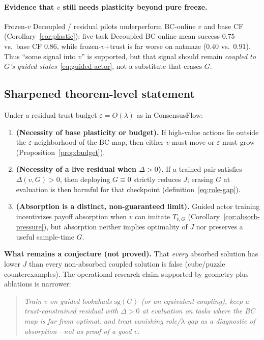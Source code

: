 \paragraph{Evidence that $v$ still needs plasticity beyond pure freeze.}
Frozen-$v$ Decoupled / residual pilots underperform BC-online $v$ and base CF
(Corollary~\ref{cor:plastic}): five-task Decoupled BC-online mean success
$0.75$ vs.\ base CF $0.86$, while frozen-$v$+trust is far worse on antmaze
($0.40$ vs.\ $0.91$).
Thus ``some signal into $v$'' is supported, but that signal should remain
\emph{coupled to $G$'s guided states}~\eqref{eq:guided-actor}, not a substitute
that erases $G$.

\subsection{Sharpened theorem-level statement}
\label{subsec:vg-sharpened}

\begin{theorem}
\label{thm:goldilocks}
Under a residual trust budget $\varepsilon=O(\lambda)$ as in ConsensusFlow:
\begin{enumerate}
  \item \textbf{(Necessity of base plasticity or budget).}
  If high-value actions lie outside the $\varepsilon$-neighborhood of the BC
  map, then either $v$ must move or $\varepsilon$ must grow
  (Proposition~\ref{prop:budget}).
  \item \textbf{(Necessity of a live residual when $\Delta>0$).}
  If a trained pair satisfies $\Delta(v,G)>0$, then deploying $G\equiv 0$
  strictly reduces $J$; erasing $G$ at evaluation is then harmful for that
  checkpoint (definition~\eqref{eq:role-gap}).
  \item \textbf{(Absorption is a distinct, non-guaranteed limit).}
  Guided actor training incentivizes payoff absorption when $v$ can imitate
  $T_{v,G}$ (Corollary~\ref{cor:absorb-pressure}), but absorption neither
  implies optimality of $J$ nor preserves a useful sample-time $G$.
\end{enumerate}
\end{theorem}

\noindent\textbf{What remains a conjecture (not proved).}
That \emph{every} absorbed solution has lower $J$ than every non-absorbed coupled
solution is false (cube/puzzle counterexamples).
The operational research claim supported by geometry plus ablations is narrower:

\begin{quote}
\emph{Train $v$ on guided lookahads $\mathrm{sg}(G)$ (or an equivalent coupling),
keep a trust-constrained residual with $\Delta>0$ at evaluation on tasks where
the BC map is far from optimal, and treat vanishing role/$\lambda$-gap as a
diagnostic of absorption---not as proof of a good $v$.}
\end{quote}

